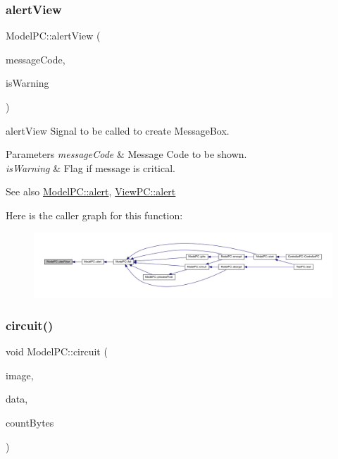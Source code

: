 \subsubsection{\texorpdfstring{alert\+View}{alertView}}
{\footnotesize\ttfamily Model\+P\+C\+::alert\+View (\begin{DoxyParamCaption}\item[{Q\+String}]{message\+Code,  }\item[{bool}]{is\+Warning }\end{DoxyParamCaption})\hspace{0.3cm}{\ttfamily [signal]}}



alert\+View Signal to be called to create Message\+Box. 


\begin{DoxyParams}{Parameters}
{\em message\+Code} & Message Code to be shown. \\
\hline
{\em is\+Warning} & Flag if message is critical. \\
\hline
\end{DoxyParams}
\begin{DoxySeeAlso}{See also}
\mbox{\hyperlink{class_model_p_c_a9079a101d83672aa48fd2dbac797de40}{Model\+P\+C\+::alert}}, \mbox{\hyperlink{class_view_p_c_a7c467169467789561078abc9d4fe57bd}{View\+P\+C\+::alert}} 
\end{DoxySeeAlso}
Here is the caller graph for this function\+:
\nopagebreak
\begin{figure}[H]
\begin{center}
\leavevmode
\includegraphics[width=350pt]{class_model_p_c_aef1f058227af54e4cfc9fc4c4397d30c_icgraph}
\end{center}
\end{figure}
\mbox{\label{class_model_p_c_a1d0091062a0c836b283ec2f67411623b}} 
\subsubsection{\texorpdfstring{circuit()}{circuit()}}
{\footnotesize\ttfamily void Model\+P\+C\+::circuit (\begin{DoxyParamCaption}\item[{Q\+Image $\ast$}]{image,  }\item[{Q\+Byte\+Array $\ast$}]{data,  }\item[{long long int}]{count\+Bytes }\end{DoxyParamCaption})\hspace{0.3cm}{\ttfamily [protected]}}



